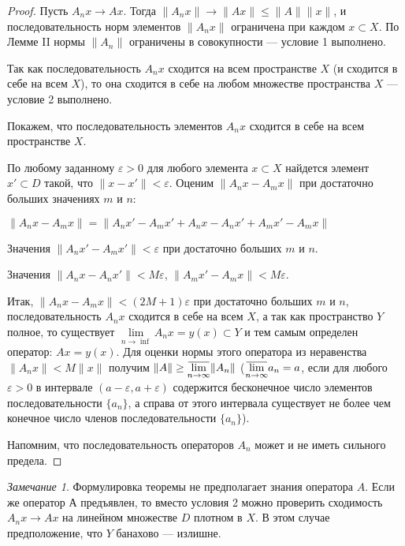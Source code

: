 \documentclass[12pt,a4paper,titlepage,oneside]{book}
\newcommand{\overbar}[1]{\mkern 1.5mu\overline{\mkern-1.5mu#1\mkern-1.5mu}\mkern 1.5mu}
\theoremstyle{definition}
\theoremstyle{plain}
\theoremstyle{remark}
\newtheorem*{remark}{Замечание}
\theoremstyle{remark}
\theoremstyle{remark}
\theoremstyle{remark}
\theoremstyle{plain}
\theoremstyle{plain}
\begin{document}
\begin{proof}
 Пусть $A_n x \to A x$. Тогда $\lVert A_n x\rVert \to \lVert A x\rVert \le \lVert A\rVert \lVert x\rVert$, и последовательность норм элементов $\lVert A_n x\rVert$ ограничена при каждом $x \subset X$. По Лемме II нормы $\lVert A_n\rVert$ ограничены в совокупности --- условие 1 выполнено.

Так как последовательность $A_n x$ сходится на всем пространстве $X$ (и сходится в себе на всем $X$), то она сходится в себе на любом множестве пространства $X$ --- условие 2 выполнено.

 Покажем, что последовательность элементов $A_n x$ сходится в себе на всем пространстве $X$.

По любому заданному $\varepsilon > 0$ для любого элемента $x \subset X$ найдется элемент $x' \subset D$ такой, что $\lVert x - x'\rVert < \varepsilon$. Оценим $\lVert A_n x - A_m x\rVert$ при достаточно больших значениях $m$ и $n$:

\begin{center}
$\lVert A_n x - A_m x\rVert = \lVert A_n x' - A_m x' + A_n x - A_n x' + A_m x' - A_m x\rVert$
\end{center}

Значения $\lVert A_n x' - A_m x'\rVert < \varepsilon$ при достаточно больших $m$ и $n$.

Значения $\lVert A_n x - A_n x'\rVert < M\varepsilon$, $\lVert A_m x' - A_m x\rVert < M\varepsilon$.

Итак, $\lVert A_n x - A_m x\rVert < (2M +1)\varepsilon$ при достаточно больших $m$ и $n$, последовательность $A_n x$ сходится в себе на всем $X$, а так как пространство $Y$ полное, то существует $\lim\limits_{n \to \inf} A_n x = y(x) \subset Y$ и тем самым определен оператор: $A x = y(x)$. Для оценки нормы этого оператора из неравенства $\lVert A_n x\rVert < M\lVert x\rVert$ получим $\lVert A\rVert \ge \overbar{\lim\limits_{n \to \infty}}\lVert A_n\rVert$ ($\overbar{\lim\limits_{n \to \infty}}a_n = a$, если для любого $\varepsilon > 0$ в интервале $(a-\varepsilon, a+\varepsilon)$ содержится бесконечное число элементов последовательности $\lbrace a_n\rbrace$, а справа от этого интервала существует не более чем конечное число членов последовательности $\lbrace a_n\rbrace$).

Напомним, что последовательность операторов $A_n$ может и не иметь сильного предела.
\end{proof}

\begin{remark}
Формулировка теоремы не предполагает знания оператора $A$. Если же оператор $А$ предъявлен, то вместо условия 2 можно проверить сходимость $A_n x\to A x$ на линейном множестве $D$ плотном в $X$. В этом случае предположение, что $Y$ банахово --- излишне.
\end{remark}
\end{document}
